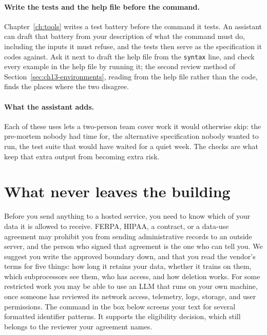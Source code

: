 \paragraph{Write the tests and the help file before the command.} Chapter~\ref{ch:tools} writes a test battery before the command it tests. An assistant can draft that battery from your description of what the command must do, including the inputs it must refuse, and the tests then serve as the specification it codes against. Ask it next to draft the help file from the \texttt{syntax} line, and check every example in the help file by running it; the second review method of Section~\ref{sec:ch13-environments}, reading from the help file rather than the code, finds the places where the two disagree.

\paragraph{What the assistant adds.} Each of these uses lets a two-person team cover work it would otherwise skip: the pre-mortem nobody had time for, the alternative specification nobody wanted to run, the test suite that would have waited for a quiet week. The checks are what keep that extra output from becoming extra risk.

\section{What never leaves the building}
Before you send anything to a hosted service, you need to know which of your data it is allowed to receive. FERPA, HIPAA, a contract, or a data-use agreement may prohibit you from sending administrative records to an outside server, and the person who signed that agreement is the one who can tell you. We suggest you write the approved boundary down, and that you read the vendor's terms for five things: how long it retains your data, whether it trains on them, which subprocessors see them, who has access, and how deletion works. For some restricted work you may be able to use an LLM that runs on your own machine, once someone has reviewed its network access, telemetry, logs, storage, and user permissions. The command in the box below screens your text for several formatted identifier patterns. It supports the eligibility decision, which still belongs to the reviewer your agreement names.

